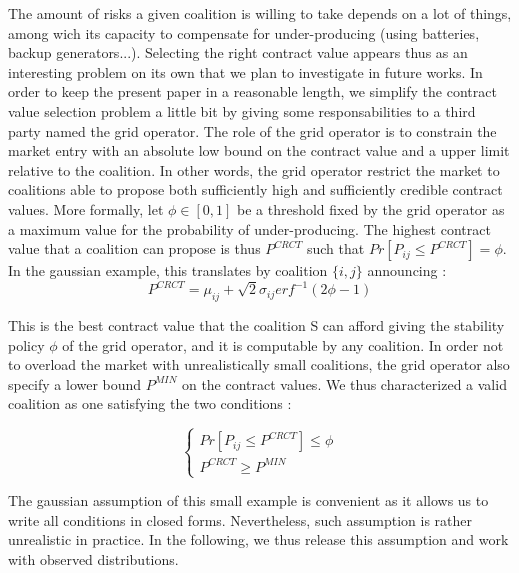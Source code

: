 \documentclass[conference]{IEEEtran}
\begin{document}
The amount of risks a given coalition is willing to take depends on a lot of things, among wich its capacity to compensate for under-producing (using batteries, backup generators...). Selecting the right contract value appears thus as an interesting problem on its own that we plan to investigate in future works. In order to keep the present paper in a reasonable length, we simplify the contract value selection problem a little bit by giving some responsabilities to a third party named the grid operator. The role of the grid operator is to constrain the market entry with an absolute low bound on the contract value and a upper limit relative to the coalition. In other words, the grid operator restrict the market to coalitions able to propose both sufficiently high and sufficiently credible contract values. More formally, let $ \phi \in [0,1] $ be a threshold fixed by the grid operator as a maximum value for the probability of under-producing. The highest contract value that a coalition can propose is thus $ P^{CRCT} $ such that $ Pr[P_{ij} \leq P^{CRCT}] = \phi $. In the gaussian example, this translates by coalition $ \{i,j\}$ announcing :
\begin{equation}
P^{CRCT} = \mu_{ij} + \sqrt{2} \sigma_{ij} erf^{-1}(2 \phi - 1 )
\end{equation}

This is the best contract value that the coalition S can afford giving the stability policy $\phi$ of the grid operator, and it is computable by any coalition. In order not to overload the market with unrealistically small coalitions, the grid operator also specify a lower bound $ P^{MIN} $ on the contract values. We thus characterized a valid coalition as one satisfying the two conditions :

\begin{equation}
\left\{ \begin{array}{lll}
			Pr[P_{ij} \leq P^{CRCT}] \leq \phi \\
			P^{CRCT} \geq P^{MIN}
\end{array} \right.
\end{equation}

The gaussian assumption of this small example is convenient as it allows us to write all conditions in closed forms. Nevertheless, such assumption is rather unrealistic in practice. In the following, we thus release this assumption and work with observed distributions.

%
%
\end{document}
